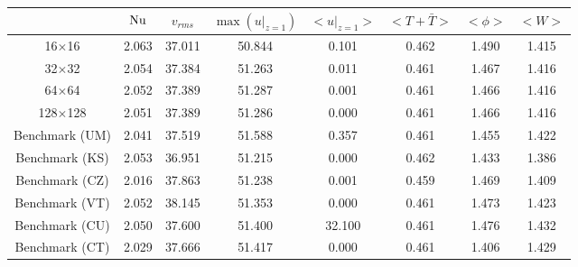 \begin{tabular}{c|ccccccc}
    & $\mathrm{Nu}$ & $v_{rms}$ & $\max(u|_{z=1})$ & $<u|_{z=1}>$ & $<T + \bar{T}>$ & $<\phi>$ & $<W>$ \\
\hline
16$\times$16 & 2.063 & 37.011 & 50.844 & 0.101 & 0.462 & 1.490 & 1.415 \\
32$\times$32 & 2.054 & 37.384 & 51.263 & 0.011 & 0.461 & 1.467 & 1.416 \\
64$\times$64 & 2.052 & 37.389 & 51.287 & 0.001 & 0.461 & 1.466 & 1.416 \\
128$\times$128 & 2.051 & 37.389 & 51.286 & 0.000 & 0.461 & 1.466 & 1.416 \\
\hline
Benchmark (UM) & 2.041 & 37.519 & 51.588 & 0.357 & 0.461 & 1.455 & 1.422 \\
Benchmark (KS) & 2.053 & 36.951 & 51.215 & 0.000 & 0.462 & 1.433 & 1.386 \\
Benchmark (CZ) & 2.016 & 37.863 & 51.238 & 0.001 & 0.459 & 1.469 & 1.409 \\
Benchmark (VT) & 2.052 & 38.145 & 51.353 & 0.000 & 0.461 & 1.473 & 1.423 \\
Benchmark (CU) & 2.050 & 37.600 & 51.400 & 32.100 & 0.461 & 1.476 & 1.432 \\
Benchmark (CT) & 2.029 & 37.666 & 51.417 & 0.000 & 0.461 & 1.406 & 1.429 \\
\end{tabular}
